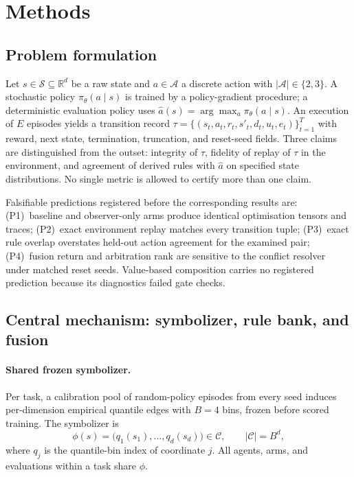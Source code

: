 \documentclass[11pt,a4paper]{article}
\theoremstyle{definition}
\begin{document}
\section{Methods}
\label{sec:methods}

\subsection{Problem formulation}

Let $s \in \mathcal{S} \subseteq \mathbb{R}^{d}$ be a raw state and
$a \in \mathcal{A}$ a discrete action with $|\mathcal{A}| \in \{2,3\}$.
A stochastic policy $\pi_{\theta}(a \mid s)$ is trained by a policy-gradient
procedure; a deterministic evaluation policy uses
$\hat{a}(s) = \arg\max_{a} \pi_{\theta}(a \mid s)$.
An execution of $E$ episodes yields a transition record
$\tau = \{(s_t, a_t, r_t, s'_t, d_t, u_t, e_t)\}_{t=1}^{T}$ with reward,
next state, termination, truncation, and reset-seed fields. Three claims are
distinguished from the outset: integrity of $\tau$, fidelity of replay of
$\tau$ in the environment, and agreement of derived rules with $\hat{a}$ on
specified state distributions. No single metric is allowed to certify more
than one claim.

Falsifiable predictions registered before the corresponding results are:
(P1)~baseline and observer-only arms produce identical optimisation tensors
and traces; (P2)~exact environment replay matches every transition tuple;
(P3)~exact rule overlap overstates held-out action agreement for the
examined pair; (P4)~fusion return and arbitration rank are sensitive to the
conflict resolver under matched reset seeds. Value-based composition carries
no registered prediction because its diagnostics failed gate checks.

\subsection{Central mechanism: symbolizer, rule bank, and fusion}

\paragraph{Shared frozen symbolizer.}
Per task, a calibration pool of random-policy episodes from every seed
induces per-dimension empirical quantile edges with $B=4$ bins, frozen before
scored training. The symbolizer is
\begin{equation}
\phi(s) = \big(q_1(s_1), \dots, q_d(s_d)\big) \in \mathcal{C},
\qquad |\mathcal{C}| = B^{d},
\label{eq:symbolizer}
\end{equation}
where $q_j$ is the quantile-bin index of coordinate $j$.
All agents, arms, and evaluations within a task share $\phi$.
\end{document}
